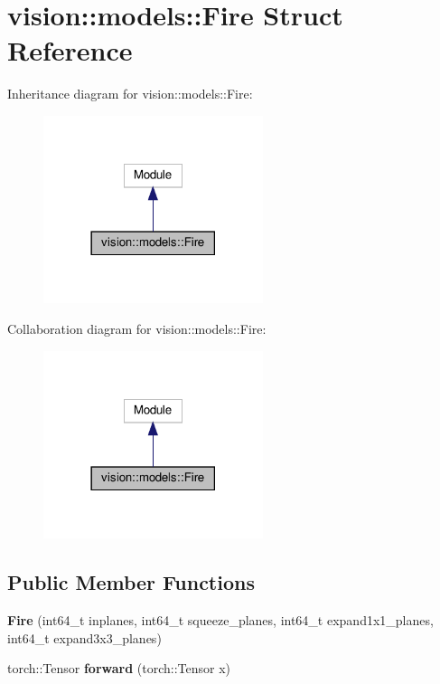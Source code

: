 \hypertarget{structvision_1_1models_1_1Fire}{}\section{vision\+:\+:models\+:\+:Fire Struct Reference}
\label{structvision_1_1models_1_1Fire}


Inheritance diagram for vision\+:\+:models\+:\+:Fire\+:
\nopagebreak
\begin{figure}[H]
\begin{center}
\leavevmode
\includegraphics[width=182pt]{structvision_1_1models_1_1Fire__inherit__graph}
\end{center}
\end{figure}


Collaboration diagram for vision\+:\+:models\+:\+:Fire\+:
\nopagebreak
\begin{figure}[H]
\begin{center}
\leavevmode
\includegraphics[width=182pt]{structvision_1_1models_1_1Fire__coll__graph}
\end{center}
\end{figure}
\subsection*{Public Member Functions}
\begin{DoxyCompactItemize}
\item 
\mbox{\label{structvision_1_1models_1_1Fire_ae473808d2973571e9d227688065e6fb0}} 
{\bfseries Fire} (int64\+\_\+t inplanes, int64\+\_\+t squeeze\+\_\+planes, int64\+\_\+t expand1x1\+\_\+planes, int64\+\_\+t expand3x3\+\_\+planes)
\item 
\mbox{\label{structvision_1_1models_1_1Fire_acb14620a58d58d7b71a432913476003c}} 
torch\+::\+Tensor {\bfseries forward} (torch\+::\+Tensor x)
\end{DoxyCompactItemize}
